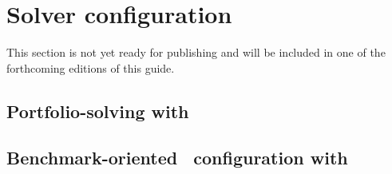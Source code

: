 
\section{Solver configuration}
\label{sec:configuration}

This section is not yet ready for publishing
and will be included in one of the forthcoming editions of this guide.

\subsection{Portfolio-solving with \claspfolio}
\label{sec:claspfolio}

\subsection{Benchmark-oriented \clasp\ configuration with \piclasp}
\label{sec:piclasp}



